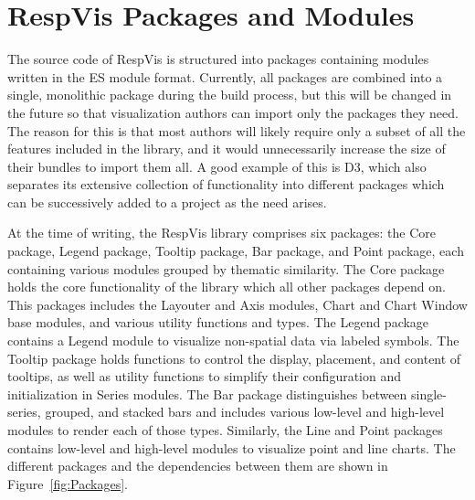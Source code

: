 \chapter{RespVis Packages and Modules}
\label{chap:Packages}

The source code of RespVis is structured into packages containing
modules written in the ES module format. Currently, all packages are
combined into a single, monolithic package during the build process,
but this will be changed in the future so that visualization authors
can import only the packages they need. The reason for this is that
most authors will likely require only a subset of all the features
included in the library, and it would unnecessarily increase the size
of their bundles to import them all. A good example of this is D3,
which also separates its extensive collection of functionality into
different packages which can be successively added to a project as the
need arises.

At the time of writing, the RespVis library comprises six packages:
the Core package, Legend package,
Tooltip package, Bar package, and Point
package, each containing various modules grouped by thematic
similarity. The Core package holds the core functionality of
the library which all other packages depend on. This packages includes
the Layouter and Axis modules, Chart and
Chart Window base modules, and various utility functions and
types. The Legend package contains a Legend module
to visualize non-spatial data via labeled symbols. The
Tooltip package holds functions to control the display,
placement, and content of tooltips, as well as utility functions to
simplify their configuration and initialization in Series
modules. The Bar package distinguishes between
single-series, grouped, and stacked bars and includes various
low-level and high-level modules to render each of those types.
Similarly, the Line and Point packages contains
low-level and high-level modules to visualize point and line charts.
The different packages and the dependencies between them are shown in
Figure~\ref{fig:Packages}.


